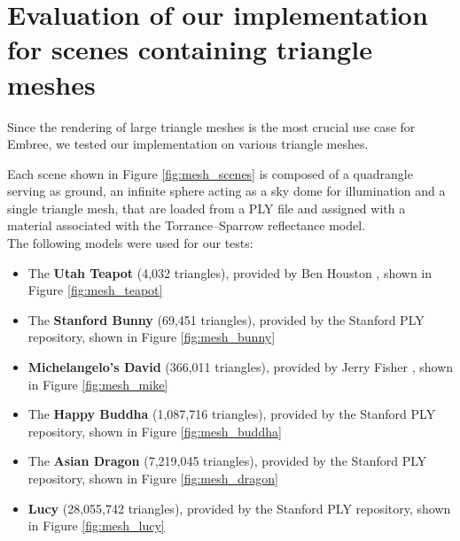 \section{Evaluation of our implementation for scenes containing triangle meshes}
\label{sec:result_meshes}

Since the rendering of large triangle meshes is the most crucial use case for Embree, we tested our implementation on various triangle meshes.

Each scene shown in Figure \ref{fig:mesh_scenes} is composed of a quadrangle serving as ground, an infinite sphere acting as a sky dome for illumination and a single triangle mesh, that are loaded from a PLY file and assigned with a material associated with the Torrance–Sparrow reflectance model.
\\

\noindent The following models were used for our tests:
\begin{itemize}
	\setlength\itemsep{0.05em}
	
	\item The \textbf{Utah Teapot} (4,032 triangles), provided by Ben Houston \cite{teapot}, shown in Figure \ref{fig:mesh_teapot}
	\item The \textbf{Stanford Bunny} (69,451 triangles), provided by the Stanford PLY repository, shown in Figure \ref{fig:mesh_bunny}
	\item \textbf{Michelangelo's David} (366,011 triangles), provided by Jerry Fisher \cite{david}, shown in Figure \ref{fig:mesh_mike}
	\item The \textbf{Happy Buddha} (1,087,716 triangles), provided by the Stanford PLY repository, shown in Figure \ref{fig:mesh_buddha}
	\item The \textbf{Asian Dragon} (7,219,045 triangles), provided by the Stanford PLY repository, shown in Figure \ref{fig:mesh_dragon}
	\item \textbf{Lucy} (28,055,742 triangles), provided by the Stanford PLY repository, shown in Figure \ref{fig:mesh_lucy}
\end{itemize}


